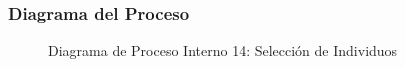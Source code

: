 \subsubsection{Diagrama del Proceso}
\begin{figure}[H]
    \centering
    \caption{Diagrama de Proceso Interno 14: Selección de Individuos}%
    \label{fig:process_diagram14}
\end{figure}
\newpage
